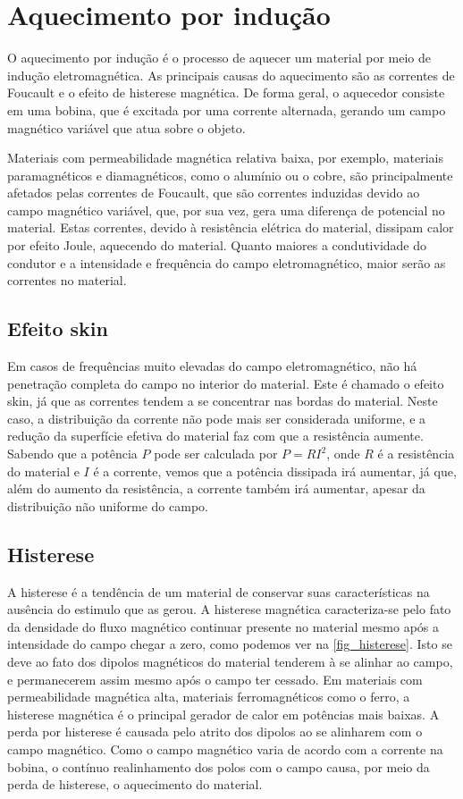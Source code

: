 \chapter{Aquecimento por indução}
O aquecimento por indução\cite{wiki-induction} é o processo de aquecer um material por meio de indução eletromagnética. As principais causas do aquecimento são as correntes de Foucault e o efeito de histerese magnética. De forma geral, o aquecedor consiste em uma bobina, que é excitada por uma corrente alternada, gerando um campo magnético variável que atua sobre o objeto.

Materiais com permeabilidade magnética relativa baixa, por exemplo, materiais paramagnéticos e diamagnéticos, como o alumínio ou o cobre, são principalmente afetados pelas correntes de Foucault, que são correntes induzidas devido ao campo magnético variável, que, por sua vez, gera uma diferença de potencial no material. Estas correntes, devido à resistência elétrica do material, dissipam calor por efeito Joule, aquecendo do material. Quanto maiores a condutividade do condutor e a intensidade e frequência do campo eletromagnético, maior serão as correntes no material.
\section{Efeito skin}
Em casos de frequências muito elevadas do campo eletromagnético, não há penetração completa do campo no interior do material. Este é chamado o efeito skin, já que as correntes tendem a se concentrar nas bordas do material. Neste caso, a distribuição da corrente não pode mais ser considerada uniforme, e a redução da superfície efetiva do material faz com que a resistência aumente. Sabendo que a potência $P$ pode ser calculada por $P = RI^2$, onde $R$ é a resistência do material e $I$ é a corrente, vemos que a potência dissipada irá aumentar, já que, além do aumento da resistência, a corrente também irá aumentar, apesar da distribuição não uniforme do campo.
\section{Histerese}
A histerese é a tendência de um material de conservar suas características na ausência do estimulo que as gerou. A histerese magnética caracteriza-se pelo fato da densidade do fluxo magnético continuar presente no material mesmo após a intensidade do campo chegar a zero, como podemos ver na \autoref{fig_histerese}. Isto se deve ao fato dos dipolos magnéticos do material tenderem à se alinhar ao campo, e permanecerem assim mesmo após o campo ter cessado.
Em materiais com permeabilidade magnética alta, materiais ferromagnéticos como o ferro, a histerese magnética é o principal gerador de calor em potências mais baixas. A perda por histerese é causada pelo atrito dos dipolos ao se alinharem com o campo magnético. Como o campo magnético varia de acordo com a corrente na bobina, o contínuo realinhamento dos polos com o campo causa, por meio da perda de histerese, o aquecimento do material.

